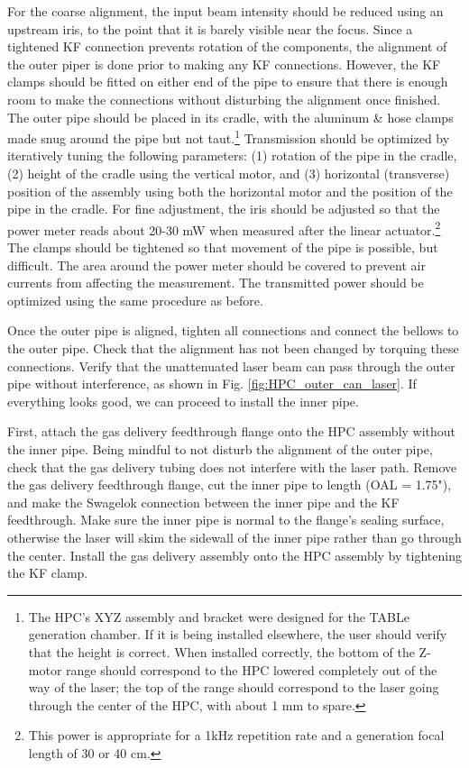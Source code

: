 For the coarse alignment, the input beam intensity should be reduced using an upstream iris, to the point that it is barely visible near the focus. Since a tightened KF connection prevents rotation of the components, the alignment of the outer piper is done prior to making any KF connections. However, the KF clamps should be fitted on either end of the pipe to ensure that there is enough room to make the connections without disturbing the alignment once finished. The outer pipe should be placed in its cradle, with the aluminum \& hose clamps made snug around the pipe but not taut.\footnote{The HPC's XYZ assembly and bracket were designed for the TABLe generation chamber. If it is being installed elsewhere, the user should verify that the height is correct. When installed correctly, the bottom of the Z-motor range should correspond to the HPC lowered completely out of the way of the laser; the top of the range should correspond to the laser going through the center of the HPC, with about 1 mm to spare.} Transmission should be optimized by iteratively tuning the following parameters: (1) rotation of the pipe in the cradle, (2) height of the cradle using the vertical motor, and (3) horizontal (transverse) position of the assembly using both the horizontal motor and the position of the pipe in the cradle. For fine adjustment, the iris should be adjusted so that the power meter reads about 20-30 mW when measured after the linear actuator.\footnote{This power is appropriate for a 1kHz repetition rate and a generation focal length of 30 or 40 cm.} The clamps should be tightened so that movement of the pipe is possible, but difficult. The area around the power meter should be covered to prevent air currents from affecting the measurement. The transmitted power should be optimized using the same procedure as before.

Once the outer pipe is aligned, tighten all connections and connect the bellows to the outer pipe. Check that the alignment has not been changed by torquing these connections. Verify that the unattenuated laser beam can pass through the outer pipe without interference, as shown in Fig. \ref{fig:HPC_outer_can_laser}. If everything looks good, we can proceed to install the inner pipe.

First, attach the gas delivery feedthrough flange onto the HPC assembly without the inner pipe. Being mindful to not disturb the alignment of the outer pipe, check that the gas delivery tubing does not interfere with the laser path. Remove the gas delivery feedthrough flange, cut the inner pipe to length (OAL = 1.75"), and make the Swagelok connection between the inner pipe and the KF feedthrough. Make sure the inner pipe is normal to the flange's sealing surface, otherwise the laser will skim the sidewall of the inner pipe rather than go through the center. Install the gas delivery assembly onto the HPC assembly by tightening the KF clamp.

